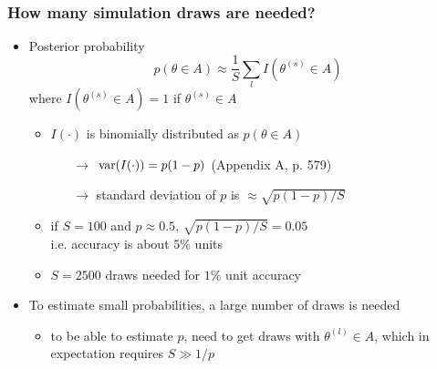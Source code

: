 \documentclass[10pt]{beamer}
\begin{document}
\begin{frame}
{\begin{minipage}[b][10cm][t]{10cm}
    \\
    \begin{center}
      \vspace{-\baselineskip}
\end{center}
  \end{minipage}
  }

\end{frame}

\begin{frame}

\frametitle{How many simulation draws are needed?}

  \begin{itemize}
  \item Posterior probability
    \begin{equation*}
      p(\theta \in A)\approx \frac{1}{S}\sum_l I(\theta^{(s)} \in A)
    \end{equation*}
    where $I(\theta^{(s)} \in A)=1$ if $\theta^{(s)} \in A$
    \begin{itemize}
    \pause
    \item $I(\cdot)$ is binomially distributed as $p(\theta \in A)$
        \begin{itemize}
        \item[$\rightarrow$] $\mathrm{var}(I(\cdot)) =  p(1-p)$  (Appendix A, p. 579)
        \item[$\rightarrow$] standard deviation of $p$ is $\approx \sqrt{p(1-p)/S}$
        \end{itemize}
        \pause
      \item if $S=100$ and $p\approx 0.5$, $\sqrt{p(1-p)/S}=0.05$\\
        i.e. accuracy is about $5\%$ units
        \pause
      \item $S=2500$ draws needed for $1\%$ unit accuracy
    \end{itemize}
    \pause
  \item To  estimate small probabilities, a large number of draws is needed
    \begin{itemize}
    \item to be able to estimate $p$, need to get draws with
      $\theta^{(l)} \in A$, which in expectation requires $S \gg 1/p$
    \end{itemize}
\end{itemize}

\end{frame}
\end{document}
